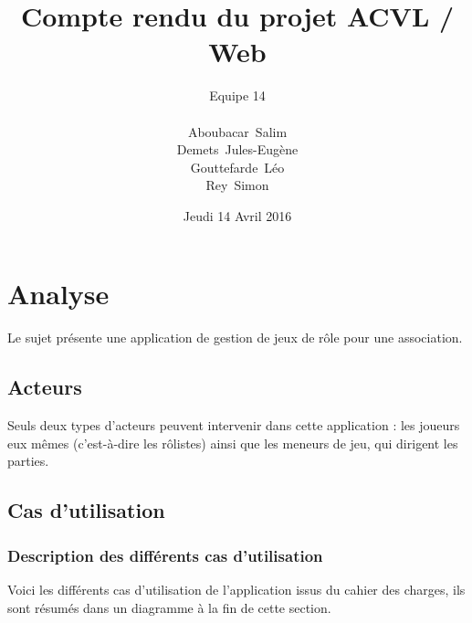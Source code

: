 \documentclass[a4paper, 11pt, titlepage]{article}
\title {{ {\huge Compte rendu du projet ACVL / Web }} }
\author{\Large Equipe 14 \\
\\
    {\sc Aboubacar}~Salim\\
    {\sc Demets}~Jules-Eugène\\
    {\sc Gouttefarde}~Léo\\
    {\sc Rey}~Simon
}
\date{Jeudi 14 Avril 2016}
\begin{document}
\pagestyle{fancy}
\maketitle

\setcounter{tocdepth}{2}

\tableofcontents
\newpage




\section {Analyse}

Le sujet présente une application de gestion de jeux de rôle pour une association.

\subsection{Acteurs}

Seuls deux types d'acteurs peuvent intervenir dans cette application : les joueurs eux mêmes (c'est-à-dire les rôlistes) ainsi que les meneurs de jeu, qui dirigent les parties.

\subsection{Cas d'utilisation}

\subsubsection{Description des différents cas d'utilisation}

Voici les différents cas d'utilisation de l'application issus du cahier des charges, ils sont résumés dans un diagramme à la fin de cette section.
\end{document}

